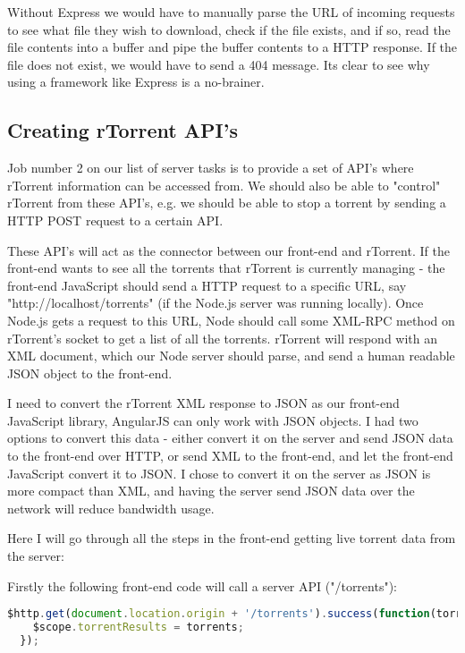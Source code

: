 Without Express we would have to manually parse the URL of incoming requests to see what file they wish to download, check if the file exists, and if so, read the file contents into a buffer and pipe the buffer contents to a HTTP response. If the file does not exist, we would have to send a 404 message. Its clear to see why using a framework like Express is a no-brainer.  

\subsection{Creating rTorrent API's}
Job number 2 on our list of server tasks is to provide a set of API's where rTorrent information can be accessed from. We should also be able to "control" rTorrent from these API's, e.g. we should be able to stop a torrent by sending a HTTP POST request to a certain API.

These API's will act as the connector between our front-end and rTorrent. If the front-end wants to see all the torrents that rTorrent is currently managing - the front-end JavaScript should send a HTTP request to a specific URL, say "http://localhost/torrents" (if the Node.js server was running locally). Once Node.js gets a request to this URL, Node should call some XML-RPC method on rTorrent's socket to get a list of all the torrents. rTorrent will respond with an XML document, which our Node server should parse, and send a human readable JSON object to the front-end.

I need to convert the rTorrent XML response to JSON as our front-end JavaScript library, AngularJS can only work with JSON objects. I had two options to convert this data - either convert it on the server and send JSON data to the front-end over HTTP, or send XML to the front-end, and let the front-end JavaScript convert it to JSON. I chose to convert it on the server as JSON is more compact than XML, and having the server send JSON data over the network will reduce bandwidth usage.

Here I will go through all the steps in the front-end getting live torrent data from the server:

Firstly the following front-end code will call a server API ("/torrents"):
\vspace{10px}
\begin{lstlisting}[caption=AngularJS performing a HTTP GET, language=JavaScript]
  $http.get(document.location.origin + '/torrents').success(function(torrents) {
    $scope.torrentResults = torrents;
  });
\end{lstlisting}


